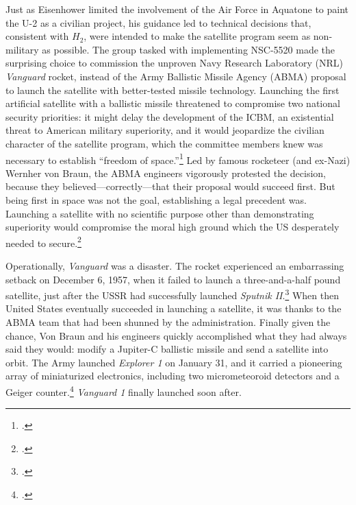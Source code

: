 \documentclass[14pt]{extarticle}
\begin{document}
Just as Eisenhower limited the involvement of the Air Force in Aquatone to paint the U-2 as a civilian project, his guidance led to technical decisions that, consistent with $H_2$, were intended to make the satellite program seem as non-military as possible. The group tasked with implementing NSC-5520 made the surprising choice to commission the unproven Navy Research Laboratory (NRL) \emph{Vanguard} rocket, instead of the Army Ballistic Missile Agency (ABMA) proposal to launch the satellite with better-tested missile technology. Launching the first artificial satellite with a ballistic missile threatened to compromise two national security priorities: it might delay the development of the ICBM, an existential threat to American military superiority, and it would jeopardize the civilian character of the satellite program, which the committee members knew was necessary to establish ``freedom of space.''\footcite[p.~122]{mcdougall_heavens_1985} Led by famous rocketeer (and ex-Nazi) Wernher von Braun, the ABMA engineers vigorously protested the decision, because they believed---correctly---that their proposal would succeed first. But being first in space was not the goal, establishing a legal precedent was. Launching a satellite with no scientific purpose other than demonstrating superiority would compromise the moral high ground which the US desperately needed to secure.\footcite[p.~129-131. Though the NRL is run by the Navy, it functioned like a civilian scientific operation. All parties involved believed that the NRL proposal would be seen as a civilian project---especially when compared with the Army agency building nuclear delivery systems.]{day_eye_2015}

Operationally, \emph{Vanguard} was a disaster. The rocket experienced an embarrassing setback on December 6, 1957, when it failed to launch a three-and-a-half pound satellite, just after the USSR had successfully launched \emph{Sputnik II}.\footcite[p.~119. This time, the satellite carried a dog named Laika. The Soviets put a dog in space before the Americans even managed to get a satellite up there.]{killian_sputnik_1977} When then United States eventually succeeded in launching a satellite, it was thanks to the ABMA team that had been shunned by the administration. Finally given the chance, Von Braun and his engineers quickly accomplished what they had always said they would: modify a Jupiter-C ballistic missile and send a satellite into orbit. The Army launched \emph{Explorer 1} on January 31, and it carried a pioneering array of miniaturized electronics, including two micrometeoroid detectors and a Geiger counter.\footcite[p.~168]{mcdougall_heavens_1985} \emph{Vanguard 1} finally launched soon after.
\end{document}
